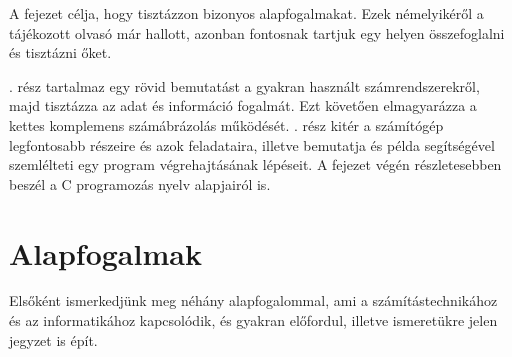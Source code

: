 A fejezet célja, hogy tisztázzon bizonyos alapfogalmakat. Ezek némelyikéről a tájékozott olvasó már hallott, azonban fontosnak tartjuk egy helyen összefoglalni és tisztázni őket.

. rész tartalmaz egy rövid bemutatást a gyakran használt számrendszerekről, majd tisztázza az adat és információ fogalmát. Ezt követően elmagyarázza a kettes komplemens számábrázolás működését.
. rész kitér a számítógép legfontosabb részeire és azok feladataira, illetve bemutatja és példa segítségével szemlélteti egy program végrehajtásának lépéseit. A fejezet végén részletesebben beszél a C programozás nyelv alapjairól is.



\section{Alapfogalmak} 
\label{alapfogalmak}

Elsőként ismerkedjünk meg néhány alapfogalommal, ami a számítástechnikához és az informatikához kapcsolódik, és gyakran előfordul, illetve ismeretükre jelen jegyzet is épít.

